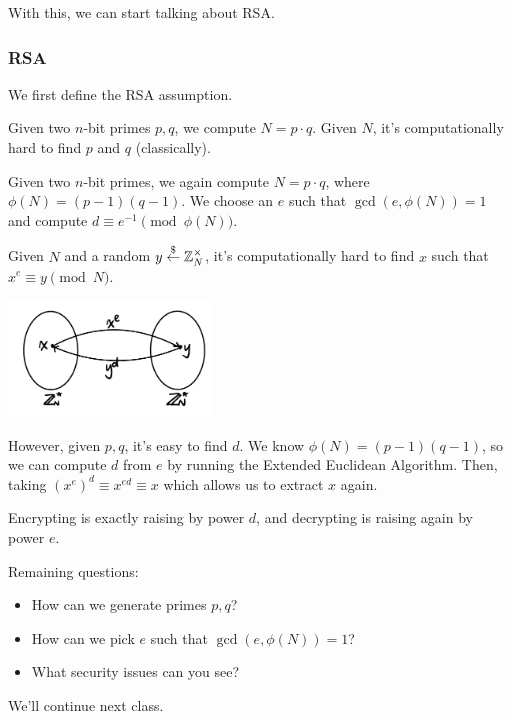 With this, we can start talking about RSA.

\subsubsection{RSA}
We first define the RSA assumption.
\begin{definition}
    Given two $n$-bit primes $p, q$, we compute $N = p\cdot q$. Given $N$, it's computationally hard to find $p$ and $q$ (classically).
\end{definition}
\begin{definition}
    Given two $n$-bit primes, we again compute $N = p\cdot q$, where $\phi(N) = (p-1)(q-1)$. We choose an $e$ such that $\gcd(e, \phi(N)) = 1$ and compute $d \equiv e^{-1}\pmod{\phi(N)}$.

    Given $N$ and a random $y\overset{\$}{\leftarrow} \mathbb Z_{N}^\times$, it's computationally hard to find $x$ such that $x^e\equiv y\pmod{N}$.

    \begin{center}
        \includegraphics[width=0.4\textwidth]{images/2023-01-31/rsa.png}
    \end{center}

    However, given $p, q$, it's easy to find $d$. We know $\phi(N) = (p-1)(q-1)$, so we can compute $d$ from $e$ by running the Extended Euclidean Algorithm. Then, taking $(x^e)^d\equiv x^{ed}\equiv x$ which allows us to extract $x$ again.
\end{definition}

Encrypting is exactly raising by power $d$, and decrypting is raising again by power $e$.

Remaining questions:
\begin{itemize}
    \item How can we generate primes $p, q$?
    \item How can we pick $e$ such that $\gcd(e, \phi(N)) = 1$?
    \item What security issues can you see?
\end{itemize}

We'll continue next class.